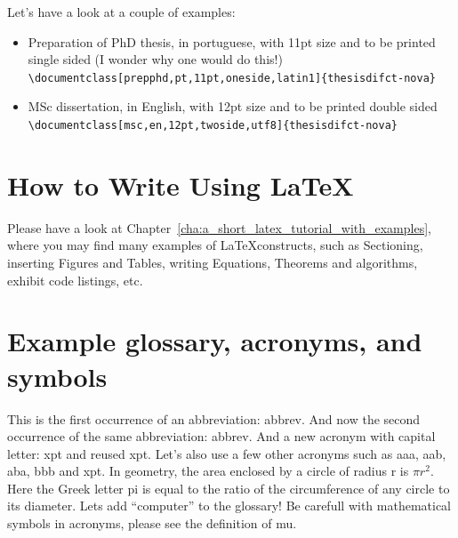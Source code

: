 Let's have a look at a couple of examples:

\begin{itemize}
  \item Preparation of PhD thesis, in portuguese, with 11pt size and to be printed single sided (I wonder why one would do this!)\\
  \verb!\documentclass[prepphd,pt,11pt,oneside,latin1]{thesisdifct-nova}!
  \item MSc dissertation, in English, with 12pt size and to be printed double sided\\
  \verb!\documentclass[msc,en,12pt,twoside,utf8]{thesisdifct-nova}!
\end{itemize}

\section{How to Write Using \LaTeX}
\label{sec:how_to_write_using_latex}

Please have a look at Chapter~\ref{cha:a_short_latex_tutorial_with_examples}, where you may find many examples of \LaTeX constructs, such as Sectioning, inserting Figures and Tables, writing Equations, Theorems and algorithms, exhibit code listings, etc.



\section{Example glossary, acronyms, and symbols}
%
%
This is the first occurrence of an abbreviation: \gls{abbrev}. And now the second occurrence of the same abbreviation: \gls{abbrev}. And a new acronym with capital letter: \Gls{xpt} and reused \gls{xpt}.  Let's also use a few other acronyms such as \gls{aaa}, \gls{aab}, \gls{aba}, \gls{bbb} and \gls{xpt}.
In geometry, the area enclosed by a circle of radius \gls{r} is $\pi r^2$. Here the Greek letter \gls{pi} is equal to the ratio of the circumference of any circle to its diameter.
Lets add ``\gls{computer}'' to the glossary! Be carefull with mathematical symbols in acronyms, please see the definition of \gls{mu}.
%



